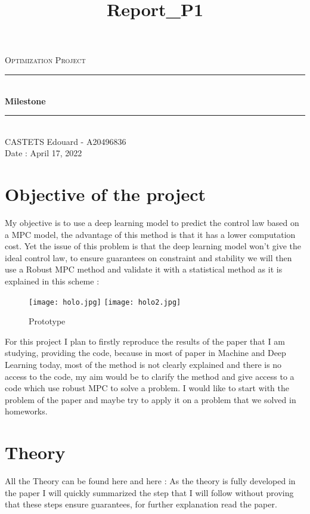 \documentclass[11pt]{article}
\title{Report\_P1}
\begin{document}
    
\begin{titlepage}
\newcommand{\HRule}{\rule{\linewidth}{0.5mm}}
\center
\vspace*{7cm}
\textsc{\LARGE
Optimization Project 
} \\[1cm]
\HRule \\[0.4cm]
{ \huge \bfseries Milestone \\[0.15cm] }
\HRule \\[1.5cm]
CASTETS Edouard - A20496836
\\[1cm]
Date : April 17, 2022\\ [1cm]
\end{titlepage}    
    
\section{Objective of the project}
My objective is to use a deep learning model to predict the control law based on a MPC model, the advantage of this method is that it has a lower computation cost. Yet the issue of this problem is that the deep learning model won't give the ideal control law, to ensure guarantees on constraint and stability we will then use a Robust MPC method and validate it with a statistical method as it is explained in this scheme :

\begin{figure}[H]
    \centering
    \texttt{[image: holo.jpg]}
    \texttt{[image: holo2.jpg]}
    \caption{Prototype} 
    \label{fig:img1}
\end{figure}

For this project I plan to firstly reproduce the results of the paper that I am studying, providing the code, because in most of paper in Machine and Deep Learning today, most of the method is not clearly explained and there is no access to the code, my aim would be to clarify the method and give access to a code which use robust MPC to solve a problem. I would like to start with the problem of the paper and maybe try to apply it on a problem that we solved in homeworks.

\section{Theory}

All the Theory can be found here \cite{} and here \cite{} :
\newline
As the theory is fully developed in the paper I will quickly summarized the step that I will follow without proving that these steps ensure guarantees, for further explanation read the paper.
\end{document}
